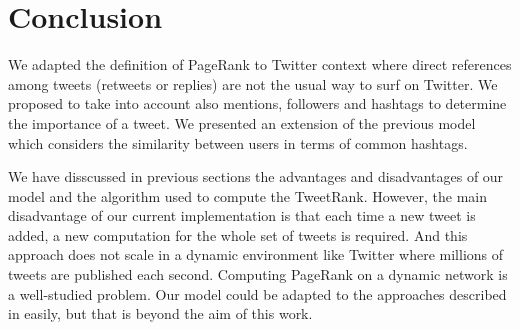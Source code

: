 \section{Conclusion}
We adapted the definition of PageRank to Twitter context where direct references among tweets (retweets or replies) are not the usual way to surf on Twitter. We proposed to take into account also mentions, followers and hashtags to determine the importance of a tweet. We presented an extension of the previous model which considers the similarity between users in terms of common hashtags. 

We have disscussed in previous sections the advantages and disadvantages of our model and the algorithm used to compute the TweetRank. However, the main disadvantage of our current implementation is that each time a new tweet is added, a new computation for the whole set of tweets is required. And this approach does not scale in a dynamic environment like Twitter where millions of tweets are published each second. Computing PageRank on a dynamic network is a well-studied problem. Our model could be adapted to the approaches described in \cite{Bahmani:2010:FIP:1929861.1929864,Desikan:2005:IPR:1062745.1062885} easily, but that is beyond the aim of this work.